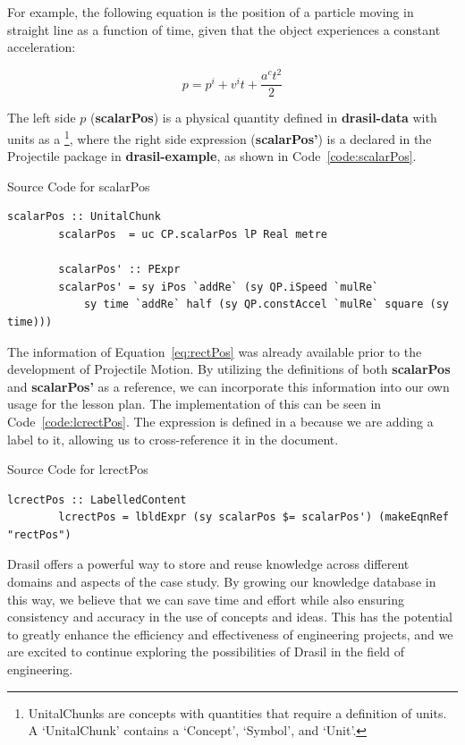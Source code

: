 For example, the following equation is the position of a particle moving in 
straight line as a function of time, given that the object experiences a 
constant acceleration:
 
\begin{equation}
	\label{eq:rectPos}
	p=p^i+v^it+\frac{a^ct^2}{2}
\end{equation}

The left side $p$ (\textbf{scalarPos}) is a physical quantity defined in 
\textbf{drasil-data} with units as a  
\footnote{UnitalChunks are concepts with quantities that require a definition 
of units. A `UnitalChunk' contains a `Concept', `Symbol', and `Unit'.}, where 
the right side expression (\textbf{scalarPos'}) is a  declared 
in the Projectile package in \textbf{drasil-example}, as shown in 
Code~\ref{code:scalarPos}. 

\begin{listing}[h!]
	\caption{Source Code for scalarPos} 
	\label{code:scalarPos}
	\begin{lstlisting}[language=haskell1]		
		scalarPos :: UnitalChunk
		scalarPos  = uc CP.scalarPos lP Real metre
		
		scalarPos' :: PExpr
		scalarPos' = sy iPos `addRe` (sy QP.iSpeed `mulRe` 
			sy time `addRe` half (sy QP.constAccel `mulRe` square (sy time)))
	\end{lstlisting}
\end{listing}

The information of Equation~\ref{eq:rectPos} was already available prior to 
the development of Projectile Motion. By utilizing the definitions of both 
\textbf{scalarPos} and \textbf{scalarPos'} as a reference, we can incorporate 
this information into our own usage for the lesson plan. The implementation of 
this can be seen in Code~\ref{code:lcrectPos}. The expression is defined in a 
 because we are adding a label to it, allowing us to 
cross-reference it in the document.

\begin{listing}[h!]
	\caption{Source Code for lcrectPos} 
	\label{code:lcrectPos}
	\begin{lstlisting}[language=haskell1]		
		lcrectPos :: LabelledContent
		lcrectPos = lbldExpr (sy scalarPos $= scalarPos') (makeEqnRef "rectPos")
	\end{lstlisting}
\end{listing}

Drasil offers a powerful way to store and reuse knowledge across different 
domains and aspects of the case study. By growing our knowledge database in 
this way, we believe that we can save time and effort while also ensuring 
consistency and accuracy in the use of concepts and ideas. This has the 
potential to greatly enhance the efficiency and effectiveness of engineering 
projects, and we are excited to continue exploring the possibilities of Drasil 
in the field of engineering.


